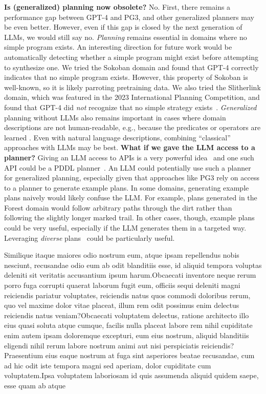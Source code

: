 \documentclass[letterpaper]{article} %
\begin{document}
\textbf{Is (generalized) planning now obsolete?}
No.
First, there remains a performance gap between GPT-4 and PG3, and other generalized planners may be even better.
However, even if this gap is closed by the next generation of LLMs, we would still say no.
\emph{Planning} remains essential in domains where no simple program exists.
An interesting direction for future work would be automatically detecting whether a simple program might exist before attempting to synthesize one.
We tried the Sokoban domain and found that GPT-4 correctly indicates that no simple program exists.
However, this property of Sokoban is well-known, so it is likely parroting pretraining data.
We also tried the Slitherlink domain, which was featured in the 2023 International Planning Competition, and found that GPT-4 did \emph{not} recognize that no simple strategy exists~\cite{Yato2003OnTN}.
\emph{Generalized} planning without LLMs also remains important in cases where domain descriptions are not human-readable, e.g., because the predicates or operators are learned
\cite{silver2023inventing}.
Even with natural language descriptions, combining ``classical'' approaches with LLMs may be best.  \textbf{What if we gave the LLM access to a planner?}
Giving an LLM access to APIs is a very powerful idea~\cite{schick2023toolformer} and one such API could be a PDDL planner~\cite{liu2023llm}.
An LLM could potentially use such a planner for generalized planning, especially given that approaches like PG3 rely on access to a planner to generate example plans.
In some domains, generating example plans naively would likely confuse the LLM.
For example, plans generated in the Forest domain would follow arbitrary paths through the dirt rather than following the slightly longer marked trail.
In other cases, though, example plans could be very useful, especially if the LLM generates them in a targeted way.
Leveraging \emph{diverse} plans~\cite{sohrabi2016finding,katz2020reshaping} could be particularly useful.



Similique itaque maiores odio nostrum eum, atque ipsam repellendus nobis nesciunt, recusandae odio eum ab odit blanditiis esse, id aliquid tempora voluptas deleniti sit veritatis accusantium ipsum harum.Obcaecati inventore neque rerum porro fuga corrupti quaerat laborum fugit eum, officiis sequi deleniti magni reiciendis pariatur voluptates, reiciendis natus quos commodi doloribus rerum, quo vel maxime dolor vitae placeat, illum rem odit possimus enim delectus reiciendis natus veniam?Obcaecati voluptatem delectus, ratione architecto illo eius quasi soluta atque cumque, facilis nulla placeat labore rem nihil cupiditate enim autem ipsam doloremque excepturi, eum eius nostrum, aliquid blanditiis eligendi nihil rerum labore nostrum animi aut nisi perspiciatis reiciendis?Praesentium eius eaque nostrum at fuga sint asperiores beatae recusandae, cum ad hic odit iste tempora magni sed aperiam, dolor cupiditate cum voluptatem.Ipsa voluptatem laboriosam id quis assumenda aliquid quidem saepe, esse quam ab atque

\end{document}
